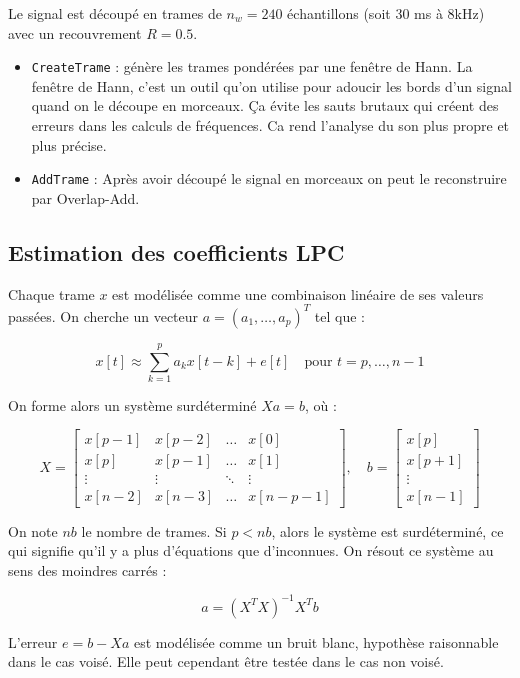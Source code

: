 \documentclass[11pt]{article}
\begin{document}
Le signal est découpé en trames de \( n_w = 240 \) échantillons (soit 30 ms à 8kHz) avec un recouvrement \( R = 0.5 \).

\begin{itemize}
    \item \texttt{CreateTrame} : génère les trames pondérées par une fenêtre de Hann. La fenêtre de Hann, c’est un outil qu’on utilise pour adoucir les bords d’un signal quand on le découpe en morceaux. Ça évite les sauts brutaux qui créent des erreurs dans les calculs de fréquences. Ca rend l’analyse du son plus propre et plus précise.
    
    \item \texttt{AddTrame} : Après avoir découpé le signal en morceaux on peut le reconstruire par Overlap-Add.
\end{itemize}

\subsection{Estimation des coefficients LPC}

Chaque trame \( x \) est modélisée comme une combinaison linéaire de ses valeurs passées. On cherche un vecteur \( a = (a_1, \ldots, a_p)^T \) tel que :

\[
x[t] \approx \sum_{k=1}^{p} a_k x[t - k] + e[t] \quad \text{pour } t = p, \ldots, n-1
\]

On forme alors un système surdéterminé \( Xa = b \), où :

\[
X =
\begin{bmatrix}
x[p-1] & x[p-2] & \dots & x[0] \\
x[p] & x[p-1] & \dots & x[1] \\
\vdots & \vdots & \ddots & \vdots \\
x[n-2] & x[n-3] & \dots & x[n-p-1]
\end{bmatrix}, \quad
b =
\begin{bmatrix}
x[p] \\
x[p+1] \\
\vdots \\
x[n-1]
\end{bmatrix}
\]

On note \( nb \) le nombre de trames. Si \( p < nb \), alors le système est surdéterminé, ce qui signifie qu’il y a plus d’équations que d’inconnues. On résout ce système au sens des moindres carrés :

\[
a = (X^T X)^{-1} X^T b
\]

L’erreur \( e = b - Xa \) est modélisée comme un bruit blanc, hypothèse raisonnable dans le cas voisé. Elle peut cependant être testée dans le cas non voisé.
\end{document}
